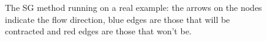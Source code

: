 \documentclass[review,a4paper]{elsarticle}
\newenvironment{stusubfig}[1]
{
	\begin{figure}[#1]
	\begin{center}
}
{
	\end{center}
	\end{figure}
}
\begin{document}
\begin{stusubfig}{!t}
\caption[The SG method running on a real example]{The SG method running on a real example: the arrows on the nodes indicate the flow direction, blue edges are those that will be contracted and red edges are those that won't be.}
\label{fig:segmentation-waterfall-smg-example}
\end{stusubfig}
\end{document}
